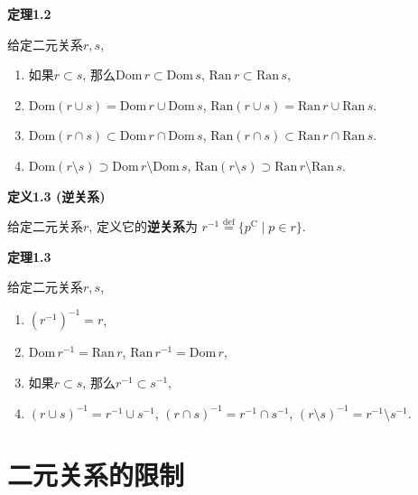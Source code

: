 \documentclass[UTF8]{ctexart}
\begin{document}
\vspace{10pt}

\hypertarget{sec:定理1.2}{}
\noindent\textbf{定理1.2}

给定二元关系$r,s$,
\begin{enumerate}
    \item 如果$r\subset s$, 那么$\mathrm{Dom}\,r\subset\mathrm{Dom}\,s$,
    $\mathrm{Ran}\,r\subset\mathrm{Ran}\,s$,
    \item $\mathrm{Dom}(r\cup s)=\mathrm{Dom}\,r\cup\mathrm{Dom}\,s$,
    $\mathrm{Ran}(r\cup s)=\mathrm{Ran}\,r\cup\mathrm{Ran}\,s$.
    \item $\mathrm{Dom}(r\cap s)\subset\mathrm{Dom}\,r\cap\mathrm{Dom}\,s$,
    $\mathrm{Ran}(r\cap s)\subset\mathrm{Ran}\,r\cap\mathrm{Ran}\,s$.
    \item $\mathrm{Dom}(r\setminus s)\supset
    \mathrm{Dom}\,r\setminus\mathrm{Dom}\,s$,
    $\mathrm{Ran}(r\setminus s)\supset\mathrm{Ran}\,r\setminus\mathrm{Ran}\,s$.
\end{enumerate}

\vspace{10pt}

\hypertarget{sec:定义1.3}{}
\noindent\textbf{定义1.3 (逆关系)}

给定二元关系$r$, 定义它的\textbf{逆关系}为
$r^{-1}\overset{\mathrm{def}}{=}\{p^\mathrm{C}\mid p\in r\}$.

\vspace{10pt}

\hypertarget{sec:定理1.3}{}
\noindent\textbf{定理1.3}

给定二元关系$r,s$,
\begin{enumerate}
    \item $(r^{-1})^{-1}=r$,
    \item $\mathrm{Dom}\,r^{-1}=\mathrm{Ran}\,r$,
    $\mathrm{Ran}\,r^{-1}=\mathrm{Dom}\,r$,
    \item 如果$r\subset s$, 那么$r^{-1}\subset s^{-1}$,
    \item $(r\cup s)^{-1}=r^{-1}\cup s^{-1}$, $(r\cap s)^{-1}=r^{-1}\cap s^{-1}$,
    $(r\setminus s)^{-1}=r^{-1}\setminus s^{-1}$.
\end{enumerate}





\newpage

\section{二元关系的限制}
\end{document}
